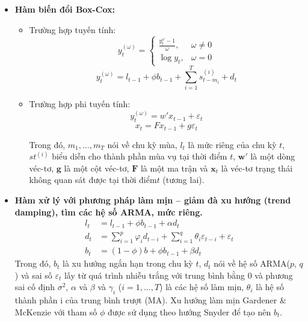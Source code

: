 \documentclass[conference]{IEEEtran}
\begin{document}
\begin{itemize}
    \item \textbf{Hàm biến đổi Box-Cox:}
    \begin{itemize}
        \item Trường hợp tuyến tính:
        \[
        y_t^{(\omega)} =
        \begin{cases}
        \frac{y_t^\omega - 1}{\omega}, & \omega \neq 0 \\
        \log y_t, & \omega = 0
        \end{cases}
        \]
        \[
    y_t^{(\omega)} = l_{t-1} + \phi b_{t-1} + \sum_{i=1}^{T} s_{t-m_i}^{(i)} + d_t
    \]

        \item Trường hợp phi tuyến tính:
        \[
        y_t^{(\omega)} = w' x_{t-1} + \varepsilon_t
        \]
        \[
        x_t = F x_{t-1} + g \varepsilon_t
        \]

        Trong đó, \( m_1, \ldots, m_T \) nói về chu kỳ mùa, \( l_t \) là mức riêng của chu kỳ \( t \), \( st^(i) \) biểu diễn cho thành phần mùa vụ tại thời điểm \( t \), \( \mathbf{w'} \) là một dòng véc-tơ, \( \mathbf{g} \) là một cột véc-tơ, \( \mathbf{F} \) là một ma trận và \( \mathbf{x}_t \) là véc-tơ trạng thái không quan sát được tại thời điểm\( t \) (tương lai). 
    \end{itemize}
    \item \textbf{Hàm xử lý với phương pháp làm mịn – giảm đà xu hướng (trend damping), tìm các hệ số ARMA, mức riêng.}
    \begin{align*}
    l_t &= l_{t-1} + \phi b_{t-1} + \alpha d_t \\
    d_t &= \sum_{i=1}^{p} \varphi_i d_{t-i} + \sum_{i=1}^{q} \theta_i \varepsilon_{t-i} + \varepsilon_t \\
    b_t &= (1 - \phi)b + \phi b_{t-1} + \beta d_t
    \end{align*}
    Trong đó, \( b_t \) là xu hướng ngắn hạn trong chu kỳ \( t \), \( d_t \) nói về hệ số ARMA(\( p \), \( q \)) và sai số \( \varepsilon_t \) lấy từ quá trình nhiễu trắng với trung bình bằng 0 và phương sai cố định \( \sigma^2 \), \( \alpha \) và \( \beta \) và \( \gamma_i \) (\( i = 1, \ldots, T \)) là các hệ số làm mịn, \( \theta_i \) là hệ số thành phần i của trung bình trượt (MA). Xu hướng làm mịn Gardener & McKenzie với tham số \( \phi \) được sử dụng theo hướng Snyder để tạo nên \( b_t \).



\end{itemize}
\end{document}
